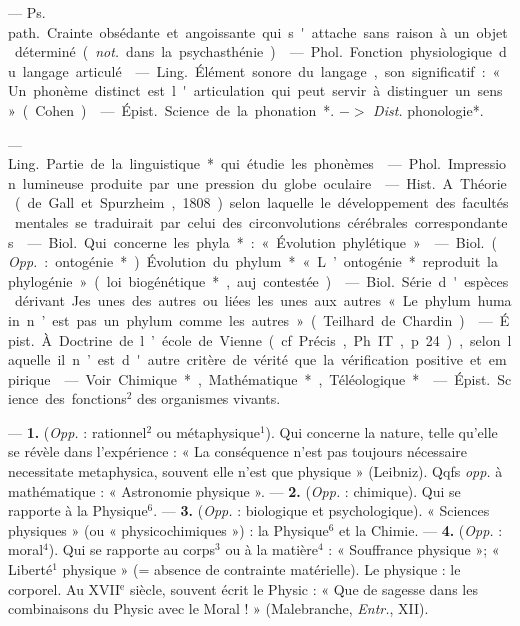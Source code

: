\begin{itemize}[leftmargin=1cm, label=, itemsep=1pt]
 — \si{Ps. path.} Crainte obsédante
et angoissante qui s'attache sans
raison à un objet déterminé ({\it not.}
dans la psychasthénie).

 — \si{Phol.} Fonction physiologique du langage articulé.

 — \si{Ling.} Élément sonore du
langage, son significatif : « Un phonème distinct est l'articulation qui
peut servir à distinguer un sens »
(Cohen).

 — \si{Épist.} Science de la
phonation*. $->$ {\it Dist.} phonologie*.

 — \si{Ling.} Partie de la linguistique* qui étudie les phonèmes.

 — \si{Phol.} Impression lumineuse produite par une pression du
globe oculaire.

 — \si{Hist.} A. Théorie (de
Gall et Spurzheim, 1808) selon laquelle le développement des facultés
mentales se traduirait par celui des
circonvolutions cérébrales correspondantes.

 — \si{Biol.} Qui concerne les
phyla* : « Évolution phylétique ».

 — \si{Biol.} ({\it Opp.} : ontogénie*). Évolution du phylum*
« L’ontogénie* reproduit la phylogénie » (loi biogénétique*, auj. contestée).

 — \si{Biol.} Série d'espèces dérivant Jes unes des autres ou liées les
unes aux autres « Le phylum
humain n’est pas un phylum comme
les autres » (Teilhard de Chardin).

 — \si{Épist.} À. Doctrine de
l’école de Vienne (cf. Précis, Ph. IT,
p. 24), selon laquelle il n’est d'autre
critère de vérité que la vérification
positive et empirique.

 — Voir Chimique*, Mathématique*, Téléologique*.

 — \si{Épist.} Science des
fonctions$^2$ des organismes vivants.

 — {\bf 1.} ({\it Opp.} : rationnel$^2$
ou métaphysique$^1$). Qui concerne la
nature, telle qu’elle se révèle dans
l'expérience : « La conséquence n’est
pas toujours nécessaire necessitate
metaphysica, souvent elle n’est que
physique » (Leibniz). Qqfs {\it opp.} à
mathématique : « Astronomie physique ». — {\bf 2.} ({\it Opp.} : chimique). Qui
se rapporte à la Physique$^6$. — {\bf 3.}
({\it Opp.} : biologique et psychologique).
« Sciences physiques » (ou « physicochimiques ») : la Physique$^6$ et la
Chimie. — {\bf 4.} ({\it Opp.} : moral$^4$). Qui se
rapporte au corps$^3$ ou à la matière$^4$ :
« Souffrance physique »; « Liberté$^1$
physique » (= absence de contrainte
matérielle). Le physique : le corporel.
Au {\footnotesize XVII}$^\text{e}$ siècle, souvent écrit le
Physic : « Que de sagesse dans les
combinaisons du Physic avec le
Moral ! » (Malebranche, {\it Entr.}, XII).


\end{itemize}
